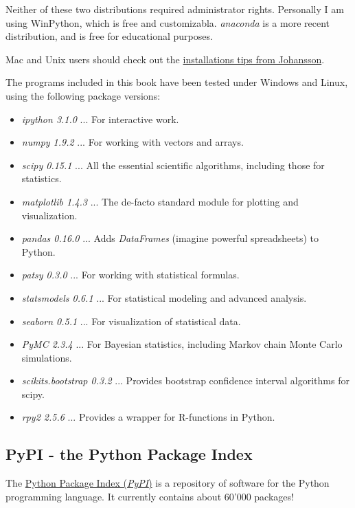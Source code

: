 Neither of these two distributions required administrator rights. Personally I am using WinPython, which is free and customizabla. \emph{anaconda} is a more recent distribution, and is free for educational purposes.

Mac and Unix users should check out the \href{https://github.com/jrjohansson/scientific-python-lectures}{installations tips from Johansson}.

The programs included in this book have been tested under Windows and Linux, using the following package versions:

\begin{itemize}
  \item \emph{ipython 3.1.0} ... For interactive work.
  \item \emph{numpy 1.9.2} ... For working with vectors and arrays.
  \item \emph{scipy 0.15.1} ... All the essential scientific algorithms, including those for statistics.
  \item \emph{matplotlib 1.4.3} ... The de-facto standard module for plotting and visualization.
  \item \emph{pandas 0.16.0} ... Adds \emph{DataFrames} (imagine powerful spreadsheets) to Python.
  \item \emph{patsy 0.3.0} ... For working with statistical formulas.
  \item \emph{statsmodels 0.6.1} ... For statistical modeling and advanced analysis.
  \item \emph{seaborn 0.5.1} ... For visualization of statistical data.
  \item \emph{PyMC 2.3.4} ... For Bayesian statistics, including Markov chain Monte Carlo simulations.
  \item \emph{scikits.bootstrap 0.3.2} ... Provides bootstrap confidence interval algorithms for scipy.
  \item \emph{rpy2 2.5.6} ... Provides a wrapper for R-functions in Python.
\end{itemize}

\subsection{PyPI - the Python Package Index}

The \href{https://pypi.python.org/pypi}{Python Package Index (\emph{PyPI})} is a repository of software for the Python programming language. It currently contains about 60'000 packages!


